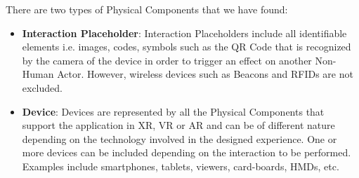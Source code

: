 \begin{itemize}
\begin{itemize}
\begin{itemize}
        \end{itemize}
        There are two types of Physical Components that we have found:
        \begin{itemize}
            \item \textbf{Interaction Placeholder}: Interaction Placeholders include all identifiable elements i.e. images, codes, symbols such as the QR Code that is recognized by the camera of the device in order to trigger an effect on another Non-Human Actor. However, wireless devices such as Beacons and RFIDs are not excluded.
            \item \textbf{Device}: Devices are represented by all the Physical Components that support the application in XR, VR or AR and can be of different nature depending on the technology involved in the designed experience. One or more devices can be included depending on the interaction to be performed. Examples include smartphones, tablets, viewers, card-boards, HMDs, etc.
        \end{itemize}


\end{itemize}
\end{itemize}
